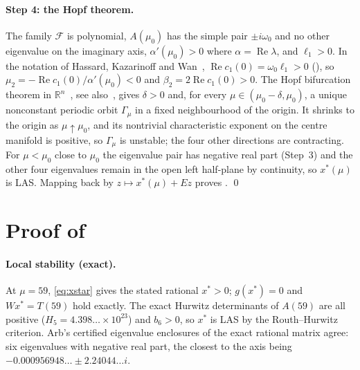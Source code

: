 \documentclass[11pt,a4paper]{report}
\begin{document}
\paragraph{Step 4: the Hopf theorem.} The family $\mathcal F$ is polynomial, $A(\mu_0)$ has the simple pair $\pm i\omega_0$ and no other eigenvalue on the imaginary axis, $\alpha'(\mu_0)>0$ where $\alpha=\operatorname{Re}\lambda$, and $\ell_1>0$. In the notation of Hassard, Kazarinoff and Wan~\autocite[Ch.~1]{HKW1981}, $\operatorname{Re}c_1(0)=\omega_0\ell_1>0$ (\autocite[§3.5]{Kuznetsov2004}), so $\mu_2=-\operatorname{Re}c_1(0)/\alpha'(\mu_0)<0$ and $\beta_2=2\operatorname{Re}c_1(0)>0$. The Hopf bifurcation theorem in $\mathbb R^n$~\autocite[Ch.~1]{HKW1981}, see also~\autocite[§§3.4--3.5, with the centre manifold reduction of Ch.~5]{Kuznetsov2004}, gives $\delta>0$ and, for every $\mu\in(\mu_0-\delta,\mu_0)$, a unique nonconstant periodic orbit $\Gamma_\mu$ in a fixed neighbourhood of the origin. It shrinks to the origin as $\mu\uparrow\mu_0$, and its nontrivial characteristic exponent on the centre manifold is positive, so $\Gamma_\mu$ is unstable; the four other directions are contracting. For $\mu<\mu_0$ close to $\mu_0$ the eigenvalue pair has negative real part (Step~3) and the other four eigenvalues remain in the open left half-plane by continuity, so $x^*(\mu)$ is LAS. Mapping back by $z\mapsto x^*(\mu)+Ez$ proves . \qed

\section{Proof of }\label{sec:proofexplicit}
\paragraph{Local stability (exact).} At $\mu=59$, \eqref{eq:xstar} gives the stated rational $x^*>0$; $g(x^*)=0$ and $Wx^*=T(59)$ hold exactly. The exact Hurwitz determinants of $A(59)$ are all positive ($H_5=4.398\ldots\times10^{23}$) and $b_6>0$, so $x^*$ is LAS by the Routh--Hurwitz criterion. Arb's certified eigenvalue enclosures of the exact rational matrix agree: six eigenvalues with negative real part, the closest to the axis being $-0.000956948\ldots\pm2.24044\ldots i$.
\end{document}
